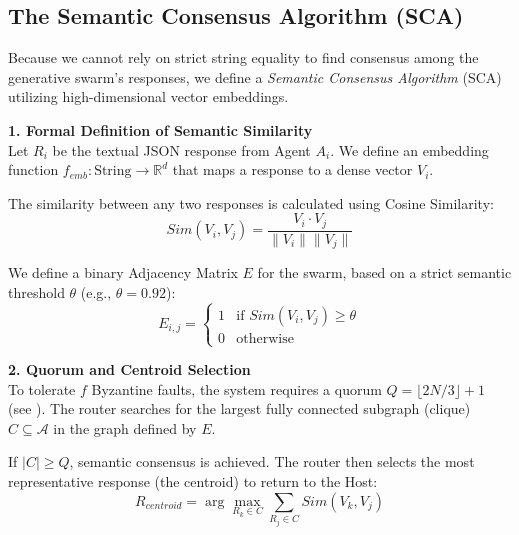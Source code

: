 \documentclass[a4paper,11pt,twocolumn]{article}
\theoremstyle{definition}
\theoremstyle{plain}
\begin{document}
\subsection{The Semantic Consensus Algorithm (SCA)}

Because we cannot rely on strict string equality to find consensus among the generative swarm's responses, we define a \textit{Semantic Consensus Algorithm} (SCA) utilizing high-dimensional vector embeddings.

\textbf{1. Formal Definition of Semantic Similarity} \\
Let $R_i$ be the textual JSON response from Agent $A_i$. We define an embedding function $f_{emb}: \text{String} \to \mathbb{R}^d$ that maps a response to a dense vector $V_i$.

The similarity between any two responses is calculated using Cosine Similarity:
\begin{equation}
    Sim(V_i, V_j) = \frac{V_i \cdot V_j}{\|V_i\| \|V_j\|}
\end{equation}

We define a binary Adjacency Matrix $E$ for the swarm, based on a strict semantic threshold $\theta$ (e.g., $\theta = 0.92$):
\begin{equation}
    E_{i,j} = \begin{cases} 
      1 & \text{if } Sim(V_i, V_j) \ge \theta \\
      0 & \text{otherwise}
   \end{cases}
\end{equation}

\textbf{2. Quorum and Centroid Selection} \\
To tolerate $f$ Byzantine faults, the system requires a quorum $Q = \lfloor 2N/3 \rfloor + 1$ (see \cite{lamport1982byzantine}). The router searches for the largest fully connected subgraph (clique) $C \subseteq \mathcal{A}$ in the graph defined by $E$.

If $|C| \ge Q$, semantic consensus is achieved. The router then selects the most representative response (the centroid) to return to the Host:
\begin{equation}
    R_{centroid} = \arg\max_{R_k \in C} \sum_{R_j \in C} Sim(V_k, V_j)
\end{equation}
\end{document}
